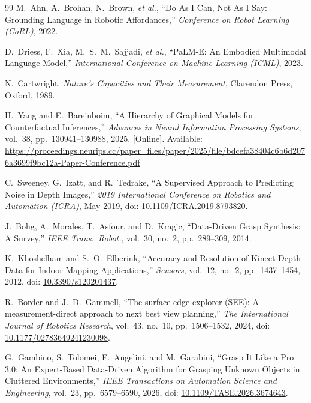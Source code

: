 \documentclass[11pt,a4paper]{report}
\begin{document}
\begin{thebibliography}{99}
M.~Ahn, A.~Brohan, N.~Brown, \emph{et al.},
``Do As I Can, Not As I Say: Grounding Language in Robotic Affordances,''
\emph{Conference on Robot Learning (CoRL)}, 2022.

D.~Driess, F.~Xia, M.~S.~M.~Sajjadi, \emph{et al.},
``PaLM-E: An Embodied Multimodal Language Model,''
\emph{International Conference on Machine Learning (ICML)}, 2023.

N.~Cartwright,
\emph{Nature's Capacities and Their Measurement},
Clarendon Press, Oxford, 1989.

H.~Yang and E.~Bareinboim,
``A Hierarchy of Graphical Models for Counterfactual Inferences,''
\emph{Advances in Neural Information Processing Systems}, vol.~38, pp.~130941--130988, 2025.
[Online]. Available: \url{https://proceedings.neurips.cc/paper_files/paper/2025/file/bdcefa38404c6b6d2076a3699f9bc12a-Paper-Conference.pdf}


C.~Sweeney, G.~Izatt, and R.~Tedrake,
``A Supervised Approach to Predicting Noise in Depth Images,''
\emph{2019 International Conference on Robotics and Automation (ICRA)}, May 2019,
doi: \href{https://doi.org/10.1109/ICRA.2019.8793820}{10.1109/ICRA.2019.8793820}.

J.~Bohg, A.~Morales, T.~Asfour, and D.~Kragic,
``Data-Driven Grasp Synthesis: A Survey,''
\emph{IEEE Trans.\ Robot.}, vol.~30, no.~2, pp.~289--309, 2014.

K.~Khoshelham and S.~O.~Elberink,
``Accuracy and Resolution of Kinect Depth Data for Indoor Mapping Applications,''
\emph{Sensors}, vol.~12, no.~2, pp.~1437--1454, 2012,
doi: \href{https://doi.org/10.3390/s120201437}{10.3390/s120201437}.

R.~Border and J.~D.~Gammell,
``The surface edge explorer (SEE): A measurement-direct approach to next best view planning,''
\emph{The International Journal of Robotics Research}, vol.~43, no.~10, pp.~1506--1532, 2024,
doi: \href{https://doi.org/10.1177/02783649241230098}{10.1177/02783649241230098}.

G.~Gambino, S.~Tolomei, F.~Angelini, and M.~Garabini,
``Grasp It Like a Pro 3.0: An Expert-Based Data-Driven Algorithm for Grasping Unknown Objects in Cluttered Environments,''
\emph{IEEE Transactions on Automation Science and Engineering}, vol.~23, pp.~6579--6590, 2026,
doi: \href{https://doi.org/10.1109/TASE.2026.3674643}{10.1109/TASE.2026.3674643}.


\end{thebibliography}
\end{document}
